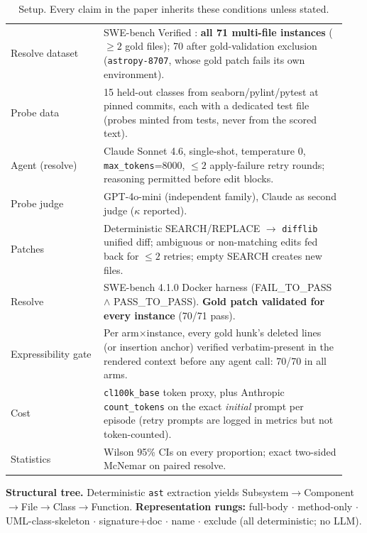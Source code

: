 \documentclass{article}
\begin{document}
\begin{table}[h]
  \centering\small
  \caption{Setup. Every claim in the paper inherits these conditions unless stated.}
  \label{tab:setup}
  \begin{tabular}{@{}p{0.26\linewidth}p{0.68\linewidth}@{}}
    \toprule
    Resolve dataset & SWE-bench Verified \citep{swebench}: \textbf{all 71 multi-file instances}
    ($\geq 2$ gold files); 70 after gold-validation exclusion (\texttt{astropy-8707}, whose gold
    patch fails its own environment). \\
    Probe data & 15 held-out classes from seaborn/pylint/pytest at pinned commits, each with a
    dedicated test file (probes minted from tests, never from the scored text). \\
    Agent (resolve) & Claude Sonnet 4.6, single-shot, temperature 0, \texttt{max\_tokens}=8000,
    $\leq 2$ apply-failure retry rounds; reasoning permitted before edit blocks. \\
    Probe judge & GPT-4o-mini (independent family), Claude as second judge
    ($\kappa$ reported). \\
    Patches & Deterministic SEARCH/REPLACE $\to$ \texttt{difflib} unified diff; ambiguous or
    non-matching edits fed back for $\leq 2$ retries; empty SEARCH creates new files. \\
    Resolve & SWE-bench 4.1.0 Docker harness (FAIL\_TO\_PASS $\wedge$ PASS\_TO\_PASS).
    \textbf{Gold patch validated for every instance} (70/71 pass). \\
    Expressibility gate & Per arm$\times$instance, every gold hunk's deleted lines (or insertion
    anchor) verified verbatim-present in the rendered context before any agent call: 70/70 in all
    arms. \\
    Cost & \texttt{cl100k\_base} token proxy, plus Anthropic \texttt{count\_tokens} on the exact
    \emph{initial} prompt per episode (retry prompts are logged in metrics but not token-counted). \\
    Statistics & Wilson 95\% CIs on every proportion; exact two-sided McNemar on paired resolve. \\
    \bottomrule
  \end{tabular}
\end{table}

\textbf{Structural tree.} Deterministic \texttt{ast} extraction yields
Subsystem$\to$Component$\to$File$\to$Class$\to$Function. \textbf{Representation rungs:} full-body
$\cdot$ method-only $\cdot$ UML-class-skeleton $\cdot$ signature+doc $\cdot$ name $\cdot$ exclude
(all deterministic; no LLM).
\end{document}
